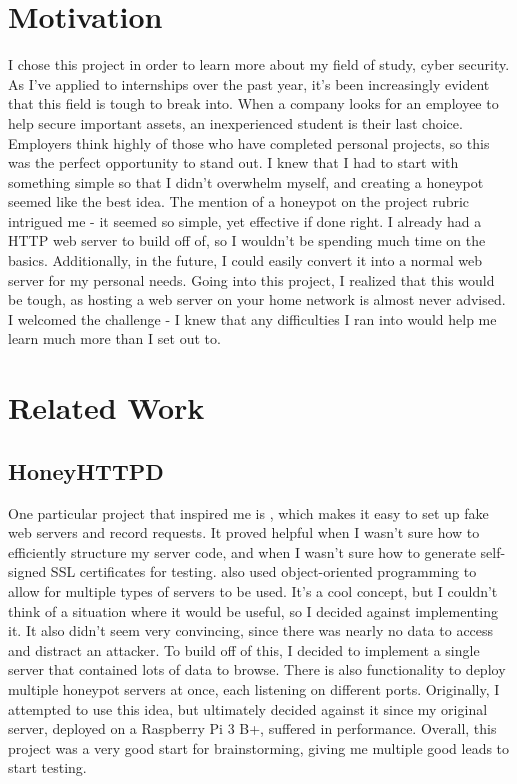 \documentclass[12pt]{article}
\begin{document}
\section{Motivation}
I chose this project in order to learn more about my field of study, cyber security.
As I've applied to internships over the past year, it's been increasingly evident that this field is tough to break into.
When a company looks for an employee to help secure important assets, an inexperienced student is their last choice.
Employers think highly of those who have completed personal projects, so this was the perfect opportunity to stand out.
I knew that I had to start with something simple so that I didn't overwhelm myself, and creating a honeypot seemed like the best idea.
The mention of a honeypot on the project rubric intrigued me - it seemed so simple, yet effective if done right.
I already had a HTTP web server to build off of, so I wouldn't be spending much time on the basics.
Additionally, in the future, I could easily convert it into a normal web server for my personal needs.
Going into this project, I realized that this would be tough, as hosting a web server on your home network is almost never advised.
I welcomed the challenge - I knew that any difficulties I ran into would help me learn much more than I set out to.

\section{Related Work}
\subsection{HoneyHTTPD}
One particular project that inspired me is , which makes it easy to set up fake web servers and record requests.
It proved helpful when I wasn't sure how to efficiently structure my server code, and when I wasn't sure how to generate self-signed SSL certificates for testing.
\textcite{honeyhttpd} also used object-oriented programming to allow for multiple types of servers to be used.
It's a cool concept, but I couldn't think of a situation where it would be useful, so I decided against implementing it.
It also didn't seem very convincing, since there was nearly no data to access and distract an attacker.
To build off of this, I decided to implement a single server that contained lots of data to browse.
There is also functionality to deploy multiple honeypot servers at once, each listening on different ports.
Originally, I attempted to use this idea, but ultimately decided against it since my original server, deployed on a Raspberry Pi 3 B+, suffered in performance.
Overall, this project was a very good start for brainstorming, giving me multiple good leads to start testing.
\end{document}
